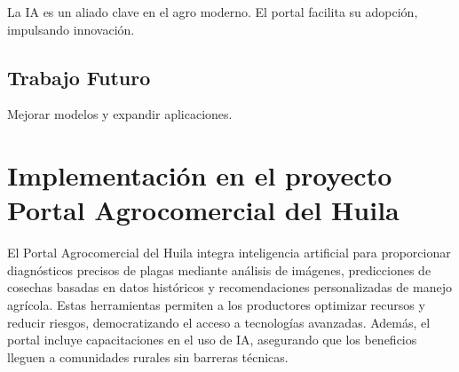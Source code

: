 La IA es un aliado clave en el agro moderno. El portal facilita su adopción, impulsando innovación.

\subsection{Trabajo Futuro}
Mejorar modelos y expandir aplicaciones.

\section{Implementación en el proyecto Portal Agrocomercial del Huila}

El Portal Agrocomercial del Huila integra inteligencia artificial para proporcionar diagnósticos precisos de plagas mediante análisis de imágenes, predicciones de cosechas basadas en datos históricos y recomendaciones personalizadas de manejo agrícola. Estas herramientas permiten a los productores optimizar recursos y reducir riesgos, democratizando el acceso a tecnologías avanzadas. Además, el portal incluye capacitaciones en el uso de IA, asegurando que los beneficios lleguen a comunidades rurales sin barreras técnicas.